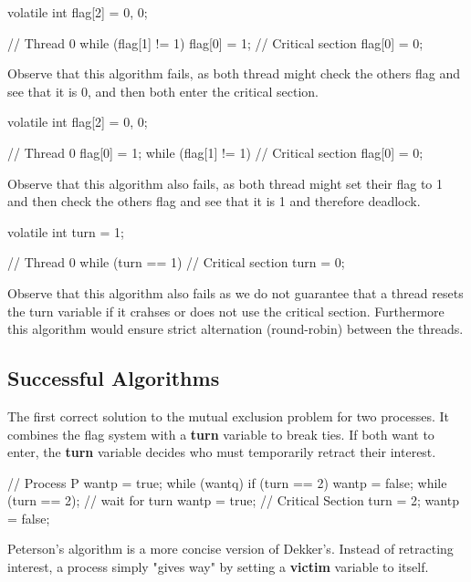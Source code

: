 \begin{algorithm}
volatile int flag[2] = {0, 0};

// Thread 0
while (flag[1] != 1) {}
flag[0] = 1;
// Critical section
flag[0] = 0;
\end{algorithm}

Observe that this algorithm fails, as both thread might check the others flag and see that it is 0, and then both enter the critical section.

\begin{algorithm}
volatile int flag[2] = {0, 0};

// Thread 0
flag[0] = 1;
while (flag[1] != 1) {}
// Critical section
flag[0] = 0;
\end{algorithm}

Observe that this algorithm also fails, as both thread might set their flag to 1 and then check the others flag and see that it is 1 and therefore deadlock.

\begin{algorithm}
volatile int turn = 1;

// Thread 0
while (turn == 1) {}
// Critical section
turn = 0;
\end{algorithm}

Observe that this algorithm also fails as we do not guarantee that a thread resets the turn variable if it crahses or does not use the critical section. Furthermore this algorithm would ensure strict alternation (round-robin) between the threads.


\subsection{Successful Algorithms}

The first correct solution to the mutual exclusion problem for two processes. It combines the flag system with a \textbf{turn} variable to break ties. If both want to enter, the \textbf{turn} variable decides who must temporarily retract their interest.

\begin{codeexample}
// Process P
wantp = true;
while (wantq) {
    if (turn == 2) {
        wantp = false;
        while (turn == 2); // wait for turn
        wantp = true;
    }
}
// Critical Section
turn = 2;
wantp = false;
\end{codeexample}

Peterson's algorithm is a more concise version of Dekker's. Instead of retracting interest, a process simply "gives way" by setting a \textbf{victim} variable to itself.

